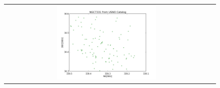 \documentclass[letterpaper,12pt]{article}
\begin{document}
\begin{figure}[h!]
\begin{tabular}{cc}
                                                                                                                                                                                                                                                                                                                                                                                                                                                                                                                                                                                                                                                                                                                                                                                \includegraphics[width=0.5\textwidth]{usno.png} &

\end{tabular}
\end{figure}
\end{document}
